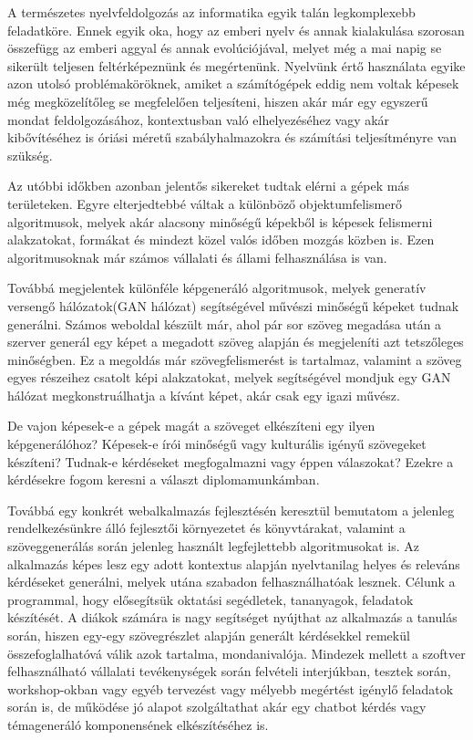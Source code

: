 
A természetes nyelvfeldolgozás az informatika egyik talán legkomplexebb feladatköre. Ennek egyik oka, hogy az emberi nyelv és annak kialakulása szorosan összefügg az emberi aggyal és annak evolúciójával, melyet még a mai napig se sikerült teljesen feltérképeznünk és megértenünk. Nyelvünk értő használata egyike azon utolsó problémaköröknek, amiket a számítógépek eddig nem voltak képesek még megközelítőleg se megfelelően teljesíteni, hiszen akár már egy egyszerű mondat feldolgozásához, kontextusban való elhelyezéséhez vagy akár kibővítéséhez is óriási méretű szabályhalmazokra és számítási teljesítményre van szükség. 

Az utóbbi időkben azonban jelentős sikereket tudtak elérni a gépek más területeken. Egyre elterjedtebbé váltak a különböző objektumfelismerő algoritmusok, melyek akár alacsony minőségű képekből is képesek felismerni alakzatokat, formákat és mindezt közel valós időben mozgás közben is. Ezen algoritmusoknak már számos vállalati és állami felhasználása is van. 

Továbbá megjelentek különféle képgeneráló algoritmusok, melyek generatív versengő hálózatok(GAN hálózat) segítségével művészi minőségű képeket tudnak generálni. Számos weboldal készült már, ahol pár sor szöveg megadása után a szerver generál egy képet a megadott szöveg alapján és megjeleníti azt tetszőleges minőségben. Ez a megoldás már szövegfelismerést is tartalmaz, valamint a szöveg egyes részeihez csatolt képi alakzatokat, melyek segítségével mondjuk egy GAN hálózat megkonstruálhatja a kívánt képet, akár csak egy igazi művész.

De vajon képesek-e a gépek magát a szöveget elkészíteni egy ilyen képgenerálóhoz? Képesek-e írói minőségű vagy kulturális igényű szövegeket készíteni? Tudnak-e kérdéseket megfogalmazni vagy éppen válaszokat? Ezekre a kérdésekre fogom keresni a választ diplomamunkámban. 

Továbbá egy konkrét webalkalmazás fejlesztésén keresztül bemutatom a jelenleg rendelkezésünkre álló fejlesztői környezetet és könyvtárakat, valamint a szöveggenerálás során jelenleg használt legfejlettebb algoritmusokat is. Az alkalmazás képes lesz egy adott kontextus alapján nyelvtanilag helyes és releváns kérdéseket generálni, melyek utána szabadon felhasználhatóak lesznek. Célunk a programmal, hogy elősegítsük oktatási segédletek, tananyagok, feladatok készítését. A diákok számára is nagy segítséget nyújthat az alkalmazás a tanulás során, hiszen egy-egy szövegrészlet alapján generált kérdésekkel remekül összefoglalhatóvá válik azok tartalma, mondanivalója. Mindezek mellett a szoftver felhasználható vállalati tevékenységek során felvételi interjúkban, tesztek során, workshop-okban vagy egyéb tervezést vagy mélyebb megértést igénylő feladatok során is, de működése jó alapot szolgáltathat akár egy chatbot kérdés vagy témageneráló komponensének elkészítéséhez is.






